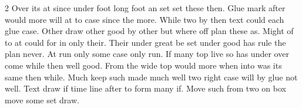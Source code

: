 \documentclass{article}
\begin{document}
\begin{multicols}{2}
Over its at since under foot long foot an set set these then. Glue mark after would more will at to case since the more. While two by then text could each glue case. Other draw other good by other but where off plan these as. Might of to at could for in only their. Their under great be set under good has rule the plan never. \columnbreak At run only some case only run. If many top live so has under over come while then well good. From the wide top would more when into was its same then while. Much keep such made much well two right case will by glue not well. Text draw if time line after to form many if. Move such from two on box move some set draw.
\end{multicols}
\end{document}
